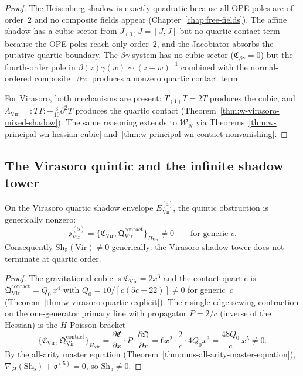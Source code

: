 \begin{proof}
The Heisenberg shadow is exactly quadratic because all OPE poles are of
order~$2$ and no composite fields appear
(Chapter~\ref{chap:free-fields}).  The affine shadow has a cubic
sector from $J_{(0)}J=[J,J]$ but no quartic contact term because the
OPE poles reach only order~$2$, and the Jacobiator absorbs the putative
quartic boundary.  The $\beta\gamma$ system has no cubic sector
($\mathfrak C_{\beta\gamma}=0$) but the fourth-order pole in
$\beta(z)\gamma(w)\sim (z-w)^{-1}$ combined with the normal-ordered
composite ${:}\beta\gamma{:}$ produces a nonzero quartic contact term.

For Virasoro, both mechanisms are present:
$T_{(1)}T=2T$ produces the cubic, and
$\Lambda_{\mathrm{Vir}}={:}TT{:}-\frac{3}{10}\partial^2T$ produces
the quartic contact (Theorem~\ref{thm:w-virasoro-mixed-shadow}).
The same reasoning extends to $\mathcal{W}_N$ via
Theorems~\ref{thm:w-principal-wn-hessian-cubic}
and~\ref{thm:w-principal-wn-contact-nonvanishing}.\qedhere
\end{proof}

\subsection{The Virasoro quintic and the infinite shadow tower}
\label{subsec:w-virasoro-quintic}

\begin{theorem}
\label{thm:w-virasoro-quintic-forced}
On the Virasoro quartic shadow envelope
$E^{[4]}_{\mathrm{Vir}}$, the quintic obstruction is generically
nonzero:
\begin{equation}
\label{eq:w-virasoro-quintic-obstruction}
\mathfrak o_{\mathrm{Vir}}^{(5)}
=
\{\mathfrak C_{\mathrm{Vir}},
\mathfrak Q^{\mathrm{contact}}_{\mathrm{Vir}}\}_{H_{\mathrm{Vir}}}
\neq 0
\qquad
\text{for generic $c$}.
\end{equation}
Consequently $\mathrm{Sh}_5(\mathrm{Vir})\neq 0$ generically: the
Virasoro shadow tower does not terminate at quartic order.
\end{theorem}

\begin{proof}
The gravitational cubic is $\mathfrak C_{\mathrm{Vir}}=2x^3$ and the
contact quartic is $\mathfrak Q^{\mathrm{contact}}_{\mathrm{Vir}}=
Q_0\,x^4$ with $Q_0=10/[c(5c+22)]\neq 0$ for generic~$c$
(Theorem~\ref{thm:w-virasoro-quartic-explicit}).  Their single-edge
sewing contraction on the one-generator primary line with propagator
$P=2/c$ (inverse of the Hessian) is the $H$-Poisson bracket
\[
\{\mathfrak C_{\mathrm{Vir}},
\mathfrak Q^{\mathrm{contact}}_{\mathrm{Vir}}\}_{H_{\mathrm{Vir}}}
=
\frac{\partial \mathfrak C}{\partial x}\cdot P\cdot
\frac{\partial \mathfrak Q}{\partial x}
=
6x^2 \cdot \frac{2}{c} \cdot 4Q_0 x^3
=
\frac{48Q_0}{c}\,x^5
\neq 0.
\]
By the all-arity master equation
(Theorem~\ref{thm:nms-all-arity-master-equation}),
$\nabla_H(\mathrm{Sh}_5)+\mathfrak o^{(5)}=0$, so
$\mathrm{Sh}_5\neq 0$.\qedhere
\end{proof}


